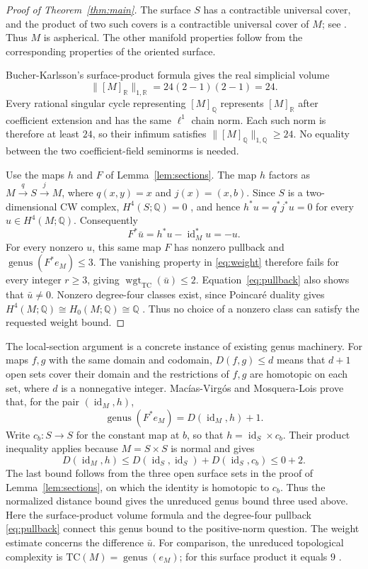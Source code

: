\documentclass[11pt]{article}
\newcommand{\Q}{\mathbb{Q}}
\newcommand{\R}{\mathbb{R}}
\newcommand{\wt}{\operatorname{wgt}_{\mathrm{TC}}}
\newcommand{\genus}{\operatorname{genus}}
\begin{document}
\begin{proof}[Proof of Theorem~\ref{thm:main}]
The surface $S$ has a contractible universal cover, and the product of
two such covers is a contractible universal cover of $M$; see
\cite[Examples 1B.2, 1B.5 and 1B.14]{H}. Thus $M$ is aspherical.
The other manifold properties follow from the corresponding properties
of the oriented surface.

Bucher-Karlsson's surface-product formula
\cite[Corollary 3]{B} gives the real simplicial volume
\[
 \|[M]_\R\|_{1,\R}=24(2-1)(2-1)=24.
\]
Every rational singular cycle representing $[M]_\Q$ represents
$[M]_\R$ after coefficient extension and has the same $\ell^1$ chain
norm. Each such norm is therefore at least $24$, so their infimum
satisfies $\|[M]_\Q\|_{1,\Q}\ge24$. No equality between the two
coefficient-field seminorms is needed.

Use the maps $h$ and $F$ of Lemma~\ref{lem:sections}. The map $h$ factors
as $M\xrightarrow{q}S\xrightarrow{j}M$, where $q(x,y)=x$ and
$j(x)=(x,b)$. Since $S$ is a two-dimensional CW complex,
$H^4(S;\Q)=0$ \cite[Theorem 3.5]{H}, and hence
$h^*u=q^*j^*u=0$ for every $u\in H^4(M;\Q)$. Consequently
\begin{equation}\label{eq:pullback}
 F^*\bar u=h^*u-\operatorname{id}_M^*u=-u.
\end{equation}
For every nonzero $u$, this same map $F$ has nonzero pullback and
$\genus(F^*e_M)\le3$. The vanishing property in
\eqref{eq:weight} therefore fails for every integer $r\ge3$, giving
$\wt(\bar u)\le2$. Equation~\eqref{eq:pullback} also shows that
$\bar u\ne0$. Nonzero degree-four classes exist, since Poincar\'e
duality gives $H^4(M;\Q)\cong H_0(M;\Q)\cong\Q$
\cite[Theorem 3.30]{H}. Thus no choice of a nonzero class can satisfy
the requested weight bound.
\end{proof}

The local-section argument is a concrete instance of existing genus
machinery. For maps $f,g$ with the same domain and codomain,
$D(f,g)\le d$ means that $d+1$ open sets cover their domain and the
restrictions of $f,g$ are homotopic on each set, where $d$ is a
nonnegative integer. Mac\'ias-Virg\'os and Mosquera-Lois prove
\cite[Theorem 2.8]{D} that, for the pair $(\operatorname{id}_M,h)$,
\[
 \genus(F^*e_M)=D(\operatorname{id}_M,h)+1.
\]
Write $c_b:S\to S$ for the constant map at $b$, so that
$h=\operatorname{id}_S\times c_b$. Their product inequality
\cite[Theorem 3.19]{D} applies because $M=S\times S$ is normal and gives
\[
 D(\operatorname{id}_M,h)
 \le D(\operatorname{id}_S,\operatorname{id}_S)
       +D(\operatorname{id}_S,c_b)\le0+2.
\]
The last bound follows from the three open surface sets in the proof of
Lemma~\ref{lem:sections}, on which the identity is homotopic to $c_b$.
Thus the normalized distance bound gives the unreduced genus bound
three used above. Here the
surface-product volume formula and the degree-four pullback
\eqref{eq:pullback} connect this genus bound to the positive-norm
question. The weight estimate concerns the difference $\bar u$. For comparison,
the unreduced topological complexity is $\mathrm{TC}(M)=\genus(e_M)$;
for this surface product it equals $9$ \cite[Example 5.7]{N}.
\end{document}
